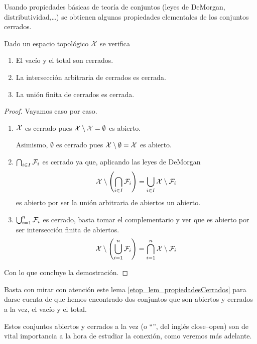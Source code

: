 Usando propiedades básicas de teoría de conjuntos (leyes de DeMorgan, distributividad,\dots) se obtienen algunas propiedades elementales de los conjuntos cerrados.
\begin{lem}
	\label{etop_lem_propiedadesCerrados}
	Dado un espacio topológico $\mathcal{X}$ se verifica
	\begin{enumerate}
		\item El vacío y el total son cerrados.
		\item La intersección arbitraria de cerrados es cerrada.
		\item La unión finita de cerrados es cerrada.
	\end{enumerate}
\end{lem}
\begin{proof}Vayamos caso por caso.
	\begin{enumerate}
		\item $\mathcal{X}$ es cerrado pues $\mathcal{X}\setminus\mathcal{X}=\emptyset$ es abierto.
		
		Asimismo, $\emptyset$ es cerrado pues $\mathcal{X}\setminus\emptyset=\mathcal{X}$ es abierto.
		\item $\bigcap_{i\in I}\mathcal{F}_i$ es cerrado ya que, aplicando las leyes de DeMorgan
		\begin{equation*}
		\mathcal{X}\setminus\left(\bigcap_{i\in I}\mathcal{F}_i\right)=\bigcup_{i\in I}\mathcal{X}\setminus\mathcal{F}_i
		\end{equation*}
		es abierto por ser la unión arbitraria de abiertos un abierto.
		\item $\bigcup_{i=1}^n\mathcal{F}_i$ es cerrado, basta tomar el complementario y ver que es abierto por ser intersección finita de abiertos.
		\begin{equation*}
		\mathcal{X}\setminus\left(\bigcup_{i=1}^{n}\mathcal{F}_i\right)=\bigcap_{i=1}^n\mathcal{X}\setminus\mathcal{F}_i
		\end{equation*}
	\end{enumerate}
	Con lo que concluye la demostración.
\end{proof}
\begin{obs}
	\label{etop_obs_abiertoCerrado}
	Basta con mirar con atención este lema \ref{etop_lem_propiedadesCerrados} para darse cuenta de que hemos encontrado dos conjuntos que son abiertos y cerrados a la vez, el vacío y el total.
	
	Estos conjuntos abiertos y cerrados a la vez (o ``'', del inglés close--open) son de vital importancia a la hora de estudiar la conexión, como veremos más adelante. 
\end{obs}
